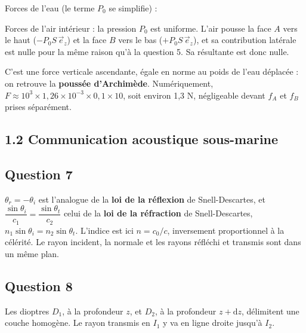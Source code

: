 \documentclass[11pt,a4paper]{article}
\newcommand{\equationajustee}[1]{%
  \sbox{\boiteequation}{$\displaystyle #1$}%
  \ifdim\wd\boiteequation>\linewidth
    \[\resizebox{\linewidth}{!}{\usebox{\boiteequation}}\]%
  \else
    \[#1\]%
  \fi}
\begin{document}
Forces de l'eau (le terme \(P_0\) se simplifie) :

\equationajustee{\begin{aligned}
\vec f_A + \vec f_B + \vec f_C &= [P(z_A) - P(z_B)]\,\pi R^2\,\vec e_z\\
&= -\mu g L\,\pi R^2\,\vec e_z
\end{aligned}}

Forces de l'air intérieur : la pression \(P_0\) est uniforme. L'air pousse la face \(A\) vers le haut (\(-P_0 S\,\vec e_z\)) et la face \(B\) vers le bas (\(+P_0 S\,\vec e_z\)), et sa contribution latérale est nulle pour la même raison qu'à la question 5. Sa résultante est donc nulle.

\equationajustee{\boxed{\vec F = -\mu\,\pi R^2 L\,g\,\vec e_z}}

C'est une force verticale ascendante, égale en norme au poids de l'eau déplacée : on retrouve la \textbf{poussée d'Archimède}. Numériquement, \(F \approx 10^3 \times 1{,}26 \times 10^{-3} \times 0{,}1 \times 10\), soit environ 1,3 N, négligeable devant \(f_A\) et \(f_B\) prises séparément.

\hypertarget{communication-acoustique-sous-marine}{%
\subsection{1.2 Communication acoustique sous-marine}\label{communication-acoustique-sous-marine}}

\hypertarget{question-7}{%
\subsection{Question 7}\label{question-7}}

\(\theta_r = -\theta_i\) est l'analogue de la \textbf{loi de la réflexion} de Snell-Descartes, et \(\dfrac{\sin\theta_i}{c_1} = \dfrac{\sin\theta_t}{c_2}\) celui de la \textbf{loi de la réfraction} de Snell-Descartes, \(n_1\sin\theta_i = n_2\sin\theta_t\). L'indice est ici \(n = c_0/c\), inversement proportionnel à la célérité. Le rayon incident, la normale et les rayons réfléchi et transmis sont dans un même plan.

\hypertarget{question-8}{%
\subsection{Question 8}\label{question-8}}

Les dioptres \(D_1\), à la profondeur \(z\), et \(D_2\), à la profondeur \(z + \mathrm{d}z\), délimitent une couche homogène. Le rayon transmis en \(I_1\) y va en ligne droite jusqu'à \(I_2\).
\end{document}
